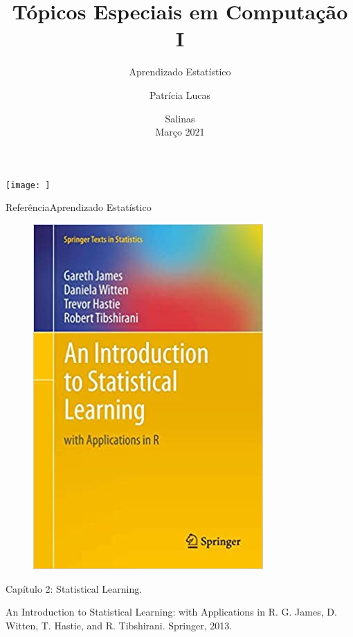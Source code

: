 \documentclass[t]{beamer}
\title[]{Tópicos Especiais em Computação I}
\subtitle[]{Aprendizado Estatístico}
\author[]{Patrícia Lucas\\{\footnotesize }}
\institute{Bacharelado em Sistemas de Informação \\ IFNMG  - Campus Salinas}
\date{\scriptsize Salinas\\Março 2021}
\begin{document}
\begin{frame}

\begin{center}
\texttt{[image: ]}
\end{center}
  \titlepage
\end{frame}


\begin{ftst}{Referência}{{Aprendizado Estatístico}}
\begin{figure}
    \includegraphics[scale=0.3]{Figuras/slide03_01.jpg}
\end{figure}
Capítulo 2:  Statistical Learning.
\vone
\scriptsize

An Introduction to Statistical Learning: with Applications in R. G. James, D. Witten, T. Hastie, and R. Tibshirani. Springer, 2013.

\end{ftst}
\end{document}
